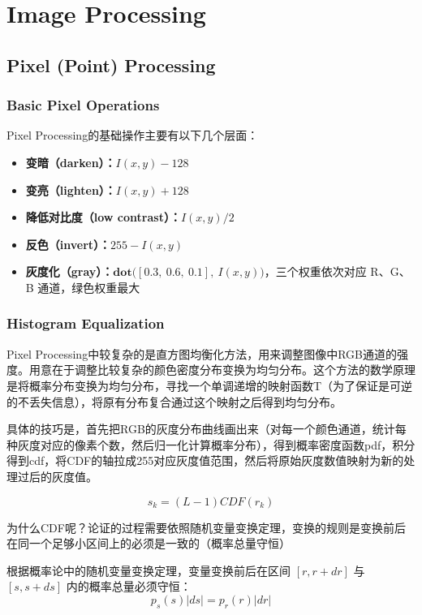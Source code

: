 \section{Image Processing}

\subsection{Pixel (Point) Processing}

\subsubsection{Basic Pixel Operations}
Pixel Processing的基础操作主要有以下几个层面：

\begin{itemize}
    \item \textbf{变暗（darken）：}$I(x,y) - 128$
    \item \textbf{变亮（lighten）：}$I(x,y) + 128$
    \item \textbf{降低对比度（low contrast）：}$I(x,y)/2$
    \item \textbf{反色（invert）：}$255 - I(x,y)$
    \item \textbf{灰度化（gray）：}$\mathbf{dot}\bigl([0.3,\ 0.6,\ 0.1],\ I(x,y)\bigr)$，三个权重依次对应 R、G、B 通道，绿色权重最大
\end{itemize}

\subsubsection{Histogram Equalization}
Pixel Processing中较复杂的是直方图均衡化方法，用来调整图像中RGB通道的强度。用意在于调整比较复杂的颜色密度分布变换为均匀分布。这个方法的数学原理是将概率分布变换为均匀分布，寻找一个单调递增的映射函数T（为了保证是可逆的不丢失信息），将原有分布复合通过这个映射之后得到均匀分布。

具体的技巧是，首先把RGB的灰度分布曲线画出来（对每一个颜色通道，统计每种灰度对应的像素个数，然后归一化计算概率分布），得到概率密度函数pdf，积分得到cdf，将CDF的轴拉成255对应灰度值范围，然后将原始灰度数值映射为新的处理过后的灰度值。

\[
s_k = (L - 1)CDF(r_k)
\]

为什么CDF呢？论证的过程需要依照随机变量变换定理，变换的规则是变换前后在同一个足够小区间上的必须是一致的（概率总量守恒）

根据概率论中的随机变量变换定理，变量变换前后在区间 $[r, r+dr]$ 与 $[s, s+ds]$ 内的概率总量必须守恒：$$p_s(s) \vert{}ds\vert{} = p_r(r) \vert{}dr\vert{}$$

